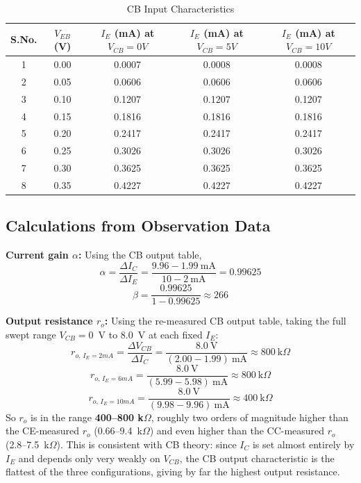 \documentclass[12pt,a4paper]{article}
\begin{document}
\begin{table}[H]
    \centering
    \caption{CB Input Characteristics}
    \begin{tabular}{|c|c|c|c|c|}
        \hline
        \textbf{S.No.} & \textbf{$V_{EB}$ (V)} & \textbf{$I_E$ (mA) at $V_{CB}=0 V$} & \textbf{$I_E$ (mA) at $V_{CB}=5 V$} & \textbf{$I_E$ (mA) at $V_{CB}=10 V$} \\ \hline
        1 & 0.00 & 0.0007 & 0.0008 & 0.0008 \\ \hline
        2 & 0.05 & 0.0606 & 0.0606 & 0.0606 \\ \hline
        3 & 0.10 & 0.1207 & 0.1207 & 0.1207 \\ \hline
        4 & 0.15 & 0.1816 & 0.1816 & 0.1816 \\ \hline
        5 & 0.20 & 0.2417 & 0.2417 & 0.2417 \\ \hline
        6 & 0.25 & 0.3026 & 0.3026 & 0.3026 \\ \hline
        7 & 0.30 & 0.3625 & 0.3625 & 0.3625 \\ \hline
        8 & 0.35 & 0.4227 & 0.4227 & 0.4227 \\ \hline
    \end{tabular}
\end{table}
\subsection{Calculations from Observation Data}
 
\textbf{Current gain $\alpha$:} Using the CB output table,
\[
\alpha = \frac{\Delta I_C}{\Delta I_E} = \frac{9.96 - 1.99\ \text{mA}}{10 - 2\ \text{mA}} = 0.99625
\]
\[
\beta = \frac{0.99625}{1-0.99625} \approx 266
\]
 
\textbf{Output resistance $r_o$:} Using the re-measured CB output table, taking the full swept range
$V_{CB}=0$~V to $8.0$~V at each fixed $I_E$:
\[
r_{o,\,I_E=2mA} = \frac{\Delta V_{CB}}{\Delta I_C} = \frac{8.0\ \text{V}}{(2.00-1.99)\ \text{mA}} \approx 800\ \text{k}\Omega
\]
\[
r_{o,\,I_E=6mA} = \frac{8.0\ \text{V}}{(5.99-5.98)\ \text{mA}} \approx 800\ \text{k}\Omega
\]
\[
r_{o,\,I_E=10mA} = \frac{8.0\ \text{V}}{(9.98-9.96)\ \text{mA}} \approx 400\ \text{k}\Omega
\]
So $r_o$ is in the range \textbf{400--800 k$\Omega$}, roughly two orders of magnitude higher than the
CE-measured $r_o$ (0.66--9.4~k$\Omega$) and even higher than the CC-measured $r_o$
(2.8--7.5~k$\Omega$). This is consistent with CB theory: since $I_C$ is set almost entirely by $I_E$ and
depends only very weakly on $V_{CB}$, the CB output characteristic is the flattest of the three
configurations, giving by far the highest output resistance.
 
\end{document}
